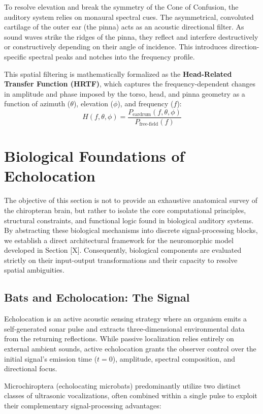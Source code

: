 To resolve elevation and break the symmetry of the Cone of Confusion, the auditory system relies on monaural spectral cues. The asymmetrical, convoluted cartilage of the outer ear (the pinna) acts as an acoustic directional filter. As sound waves strike the ridges of the pinna, they reflect and interfere destructively or constructively depending on their angle of incidence. This introduces direction-specific spectral peaks and notches into the frequency profile.

This spatial filtering is mathematically formalized as the \textbf{Head-Related Transfer Function (HRTF)}, which captures the frequency-dependent changes in amplitude and phase imposed by the torso, head, and pinna geometry as a function of azimuth ($\theta$), elevation ($\phi$), and frequency ($f$):
\begin{equation}
    H(f, \theta, \phi) = \frac{P_{\text{eardrum}}(f, \theta, \phi)}{P_{\text{free-field}}(f)}
\end{equation}


\section{Biological Foundations of Echolocation}
The objective of this section is not to provide an exhaustive anatomical survey of the chiropteran brain, but rather to isolate the core computational principles, structural constraints, and functional logic found in biological auditory systems. By abstracting these biological mechanisms into discrete signal-processing blocks, we establish a direct architectural framework for the neuromorphic model developed in Section [X]. Consequently, biological components are evaluated strictly on their input-output transformations and their capacity to resolve spatial ambiguities.

\subsection{Bats and Echolocation: The Signal}
Echolocation is an active acoustic sensing strategy where an organism emits a self-generated sonar pulse and extracts three-dimensional environmental data from the returning reflections. While passive localization relies entirely on external ambient sounds, active echolocation grants the observer control over the initial signal's emission time ($t=0$), amplitude, spectral composition, and directional focus.

Microchiroptera (echolocating microbats) predominantly utilize two distinct classes of ultrasonic vocalizations, often combined within a single pulse to exploit their complementary signal-processing advantages:

